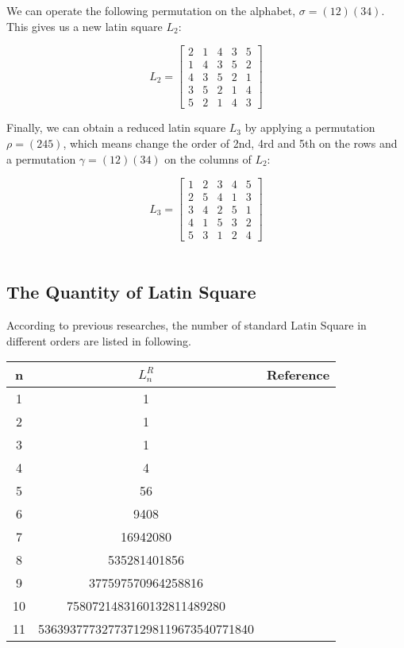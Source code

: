 \documentclass[12pt]{article}
\begin{document}
We can operate the following permutation on the alphabet, $\sigma = (12)(34)$. This gives us a
new latin square $L_2$:


\[ L_2 = \begin{bmatrix} 2 & 1 & 4 & 3 & 5\\1 & 4 & 3 & 5 & 2\\4 & 3 & 5 & 2 & 1\\
                         3 & 5 & 2 & 1 & 4\\5 & 2 & 1 & 4 & 3 \end{bmatrix} \]


Finally, we can obtain a reduced latin square $L_3$ by applying a permutation $\rho = (245)$, which means change the order of 2nd, 4rd and 5th on the rows and a permutation $\gamma = (12)(34)$ on the columns of $L_2$:


\[ L_3 = \begin{bmatrix} 1 & 2 & 3 & 4 & 5\\2 & 5 & 4 & 1 & 3\\3 & 4 & 2 & 5 & 1\\
                         4 & 1 & 5 & 3 & 2\\5 & 3 & 1 & 2 & 4 \end{bmatrix} \]\\


\subsection{The Quantity of Latin Square}

According to previous researches, the number of standard Latin Square in different orders are listed in following.


\begin{tabular}{|c|c|c|}
\hline
n & $L_n ^ {R}$& Reference\\
\hline
1&1&\\
2&1&\\
3&1&\\
4&4&\\
5&56&\\
6&9408&\cite{ref3}\\
7&16942080&\cite{ref4}\\
8&535281401856&\cite{ref5}\\
9&377597570964258816&\cite{ref6}\\
10&7580721483160132811489280&\cite{ref7}\\
11&5363937773277371298119673540771840&\cite{ref8}\\
\hline
\end{tabular}
\\
\end{document}
